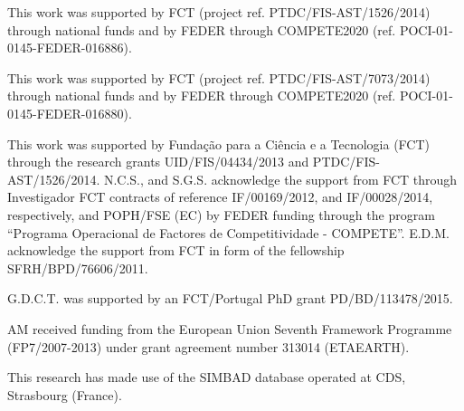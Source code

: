 \documentclass{aa}
\begin{document}
\begin{acknowledgements}

This work was supported by FCT (project ref. PTDC/FIS-AST/1526/2014) through
national funds and by FEDER through COMPETE2020 (ref.
POCI-01-0145-FEDER-016886).

This work was supported by FCT (project ref. PTDC/FIS-AST/7073/2014) through
national funds and by FEDER through COMPETE2020 (ref.
POCI-01-0145-FEDER-016880).

This work was supported by Funda\c{c}\~ao para a Ci\^encia e a Tecnologia (FCT)
through the research grants UID/FIS/04434/2013 and PTDC/FIS-AST/1526/2014.
N.C.S., and S.G.S. acknowledge the support from FCT through Investigador FCT
contracts of reference IF/00169/2012, and IF/00028/2014, respectively, and
POPH/FSE (EC) by FEDER funding through the program “Programa Operacional de
Factores de Competitividade - COMPETE”. E.D.M. acknowledge the support from FCT
in form of the fellowship SFRH/BPD/76606/2011.

G.D.C.T. was supported by an FCT/Portugal PhD grant PD/BD/113478/2015.

AM received funding from the European Union Seventh Framework Programme
(FP7/2007-2013) under grant agreement number 313014 (ETAEARTH).

This research has made use of the SIMBAD database operated at CDS, Strasbourg
(France).

\end{acknowledgements}




\end{document}
